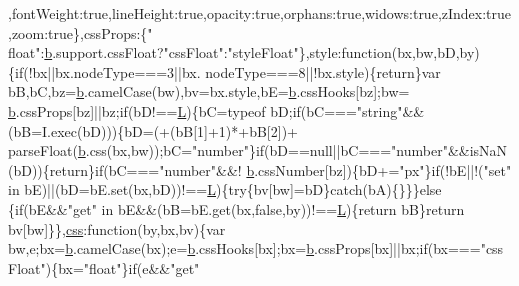 \begin{DoxyCode}
      ,fontWeight:\textcolor{keyword}{true},lineHeight:\textcolor{keyword}{true},opacity:\textcolor{keyword}{true},orphans:\textcolor{keyword}{true},widows:\textcolor{keyword}{true},zIndex:\textcolor{keyword}{true},zoom:\textcolor{keyword}{true}\},cssProps:\{\textcolor{stringliteral}{"
      float"}:\hyperlink{jquery_8js_aa4026ad5544b958e54ce5e106fa1c805}{b}.support.cssFloat?\textcolor{stringliteral}{"cssFloat"}:\textcolor{stringliteral}{"styleFloat"}\},style:\textcolor{keyword}{function}(bx,bw,bD,by)\{\textcolor{keywordflow}{if}(!bx||bx.nodeType===3||bx.
      nodeType===8||!bx.style)\{\textcolor{keywordflow}{return}\}var bB,bC,bz=\hyperlink{jquery_8js_aa4026ad5544b958e54ce5e106fa1c805}{b}.camelCase(bw),bv=bx.style,bE=\hyperlink{jquery_8js_aa4026ad5544b958e54ce5e106fa1c805}{b}.cssHooks[bz];bw=
      \hyperlink{jquery_8js_aa4026ad5544b958e54ce5e106fa1c805}{b}.cssProps[bz]||bz;\textcolor{keywordflow}{if}(bD!==\hyperlink{jquery_8js_a38ee4c0b5f4fe2a18d0c783af540d253}{L})\{bC=typeof bD;\textcolor{keywordflow}{if}(bC===\textcolor{stringliteral}{"string"}&&(bB=I.exec(bD)))\{bD=(+(bB[1]+1)*+bB[2])+
      parseFloat(\hyperlink{jquery_8js_aa4026ad5544b958e54ce5e106fa1c805}{b}.css(bx,bw));bC=\textcolor{stringliteral}{"number"}\}\textcolor{keywordflow}{if}(bD==null||bC===\textcolor{stringliteral}{"number"}&&isNaN(bD))\{\textcolor{keywordflow}{return}\}\textcolor{keywordflow}{if}(bC===\textcolor{stringliteral}{"number"}&&!
      \hyperlink{jquery_8js_aa4026ad5544b958e54ce5e106fa1c805}{b}.cssNumber[bz])\{bD+=\textcolor{stringliteral}{"px"}\}\textcolor{keywordflow}{if}(!bE||!(\textcolor{stringliteral}{"set"} in bE)||(bD=bE.set(bx,bD))!==\hyperlink{jquery_8js_a38ee4c0b5f4fe2a18d0c783af540d253}{L})\{\textcolor{keywordflow}{try}\{bv[bw]=bD\}\textcolor{keywordflow}{catch}(bA)\{\}\}\}\textcolor{keywordflow}{else}
      \{\textcolor{keywordflow}{if}(bE&&\textcolor{stringliteral}{"get"} in bE&&(bB=bE.get(bx,\textcolor{keyword}{false},by))!==\hyperlink{jquery_8js_a38ee4c0b5f4fe2a18d0c783af540d253}{L})\{\textcolor{keywordflow}{return} bB\}\textcolor{keywordflow}{return} bv[bw]\}\},\hyperlink{jquery_8js_a89ad527fcd82c01ebb587332f5b4fcd4}{css}:\textcolor{keyword}{function}(by,bx,bv)\{var 
      bw,e;bx=\hyperlink{jquery_8js_aa4026ad5544b958e54ce5e106fa1c805}{b}.camelCase(bx);e=\hyperlink{jquery_8js_aa4026ad5544b958e54ce5e106fa1c805}{b}.cssHooks[bx];bx=\hyperlink{jquery_8js_aa4026ad5544b958e54ce5e106fa1c805}{b}.cssProps[bx]||bx;\textcolor{keywordflow}{if}(bx===\textcolor{stringliteral}{"cssFloat"})\{bx=\textcolor{stringliteral}{"float"}\}\textcolor{keywordflow}{if}(e&&\textcolor{stringliteral}{"get"}

\end{DoxyCode}
